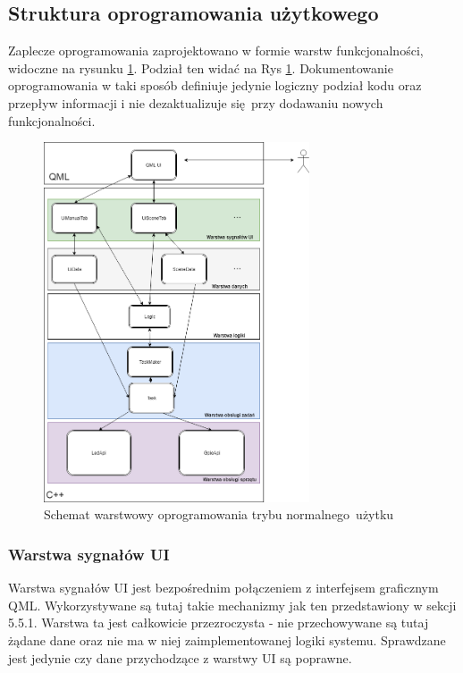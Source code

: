 \documentclass[12pt, eng, twoside, openany, final]{mgr}
\begin{document}
                \subsection{Struktura oprogramowania użytkowego}
                Zaplecze oprogramowania zaprojektowano w formie warstw funkcjonalności, widoczne na rysunku \ref{fig:layers}. Podział ten widać na Rys \ref{fig:layers}. Dokumentowanie oprogramowania w taki sposób definiuje jedynie logiczny podział kodu oraz przepływ informacji i nie dezaktualizuje się przy dodawaniu nowych funkcjonalności\cite{CleanCode}.  
                    \begin{figure}[H]
                    \begin{center}
                        \includegraphics[width=0.7\textwidth]{inz_diag1.png}
                        \caption{Schemat warstwowy oprogramowania trybu normalnego~użytku} \label{fig:layers}
                    \end{center}
                    \end{figure}
                \subsubsection{Warstwa sygnałów UI}
                Warstwa sygnałów UI jest bezpośrednim połączeniem z interfejsem graficznym QML. Wykorzystywane są tutaj takie mechanizmy jak ten przedstawiony w sekcji 5.5.1. Warstwa ta jest całkowicie przezroczysta - nie przechowywane są tutaj żądane dane oraz nie ma w niej zaimplementowanej logiki systemu. Sprawdzane jest jedynie czy dane przychodzące z warstwy UI są poprawne.
                
\end{document}
